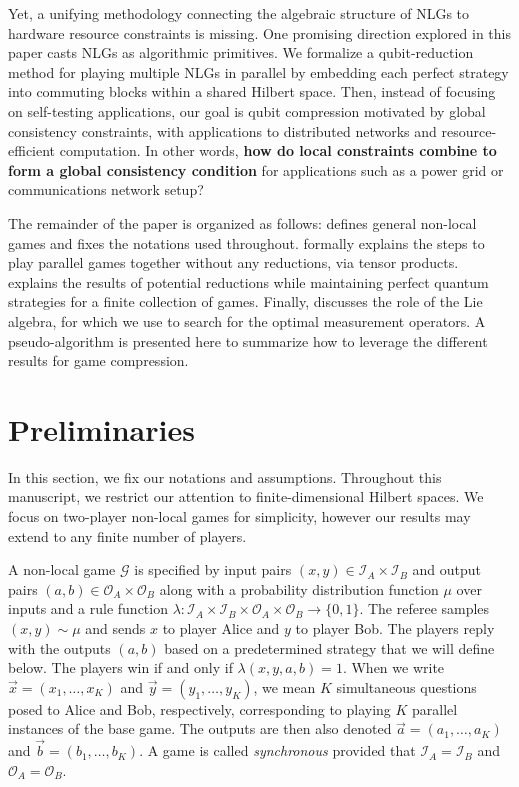 \documentclass{article}
\begin{document}
Yet, a unifying methodology connecting the algebraic structure of NLGs to hardware resource constraints is missing. One promising direction explored in this paper casts NLGs as algorithmic primitives. We formalize a qubit-reduction method for playing multiple NLGs in parallel by embedding each perfect strategy into commuting blocks within a shared Hilbert space. Then, instead of focusing on self-testing applications, our goal is qubit compression motivated by global consistency constraints, with applications to distributed networks and resource-efficient computation. In other words, \textbf{how do local constraints combine to form a global consistency condition} for applications such as a power grid or communications network setup?

    The remainder of the paper is organized as follows:
     defines general non-local games and fixes the notations used throughout.  formally explains the steps to play parallel games together without any reductions, via tensor products.  explains the results of potential reductions while maintaining perfect quantum strategies for a finite collection of games. Finally,  discusses the role of the Lie algebra, for which we use to search for the optimal measurement operators. A pseudo-algorithm is presented here to summarize how to leverage the different results for game compression.


\section{Preliminaries}\label{sec: prelims}
    In this section, we fix our notations and assumptions. Throughout this manuscript, we restrict our attention to finite-dimensional Hilbert spaces. We focus on two-player non-local games for simplicity, however our results may extend to any finite number of players.
    
    A non-local game $\mathcal{G}$ is specified by input pairs $(x,y)\in \mathcal{I}_A\times \mathcal{I}_B$ and output pairs $(a,b)\in \mathcal{O}_A\times \mathcal{O}_B$ along with a probability distribution function $\mu$ over inputs and a rule function $\lambda: \mathcal{I}_A\times \mathcal{I}_B\times \mathcal{O}_A\times \mathcal{O}_B\to \{0,1\}$. The referee samples $(x,y)\sim \mu$ and sends $x$ to player Alice and $y$ to player Bob. The players reply with the outputs $(a,b)$ based on a predetermined strategy that we will define below. The players win if and only if $\lambda(x,y,a,b)=1.$
    When we write $\vec{x} = (x_1,\dots,x_K)$ and $\vec{y} = (y_1,\dots,y_K)$,  we mean $K$ simultaneous questions posed to Alice and Bob, respectively,  corresponding to playing $K$ parallel instances of the base game.  The outputs are then also denoted $\vec{a}=(a_1,\dots,a_K)$ and $\vec{b}=(b_1,\dots,b_K)$. A game is called \textit{synchronous} provided that $\mathcal{I}_A=\mathcal{I}_B$ and $\mathcal{O}_A=\mathcal{O}_B$. 
    
\end{document}
